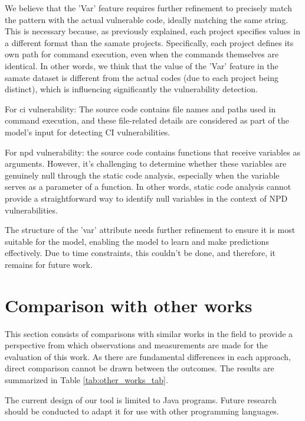 We believe that the 'Var' feature requires further refinement to precisely match the pattern with the actual vulnerable code, ideally matching the same string. This is necessary because, as previously explained, each project specifies values in a different format than the \gls{samate} projects. Specifically, each project defines its own path for command execution, even when the commands themselves are identical. In other words, we think that the value of the 'Var' feature in the \gls{samate} dataset is different from the actual codes (due to each project being distinct), which is influencing significantly the vulnerability detection.


For \gls{ci} vulnerability: The source code contains file names and paths used in command execution, and these file-related details are considered as part of the model's input for detecting CI vulnerabilities.

For \gls{npd} vulnerability: the source code contains functions that receive variables as arguments. However, it's challenging to determine whether these variables are genuinely null through the static code analysis, especially when the variable serves as a parameter of a function. In other words, static code analysis cannot provide a straightforward way to identify null variables in the context of NPD vulnerabilities.

The structure of the 'var' attribute needs further refinement to ensure it is most suitable for the model, enabling the model to learn and make predictions effectively. Due to time constraints, this couldn't be done, and therefore, it remains for future work.


\section{Comparison with other works} %
\label{sec:Comparison_with_other_works}

This section consists of comparisons with similar works in the field to provide a perspective from which observations and measurements are made for the evaluation of this work. As there are fundamental differences in each approach, direct comparison cannot be drawn between the outcomes. The results are summarized in Table \ref{tab:other_works_tab}. 

The current design of our tool is limited to Java programs. Future research should be conducted to adapt it for use with other programming languages.


